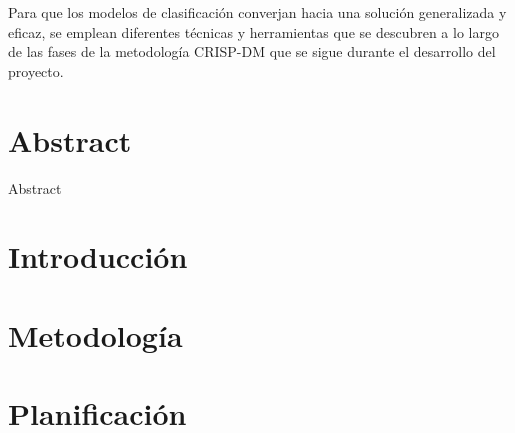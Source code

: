 \documentclass[openright,twoside,10pt]{book}
\begin{document}
Para que los modelos de clasificación converjan hacia una solución generalizada y eficaz, se emplean diferentes técnicas y herramientas que se descubren a lo largo de las fases de la metodología CRISP-DM que se sigue durante el desarrollo del proyecto.



\chapter*{Abstract} %
\begin{flushleft}

Abstract

\end{flushleft}

\tableofcontents %

\cleardoublepage
{} %
\listoffigures %

\cleardoublepage
{} %
\listoftables %

\clearpage

\printglossary[title=Glosario de términos, toctitle=Glosario de términos]
\glsaddall
\clearpage

\printglossary[type=\acronymtype]

\chapter{Introducción}\label{cap.introduccion}


\chapter{Metodología}\label{cap.metodologia}


\chapter{Planificación}
\label{cap.req-planificacion}
\end{document}
